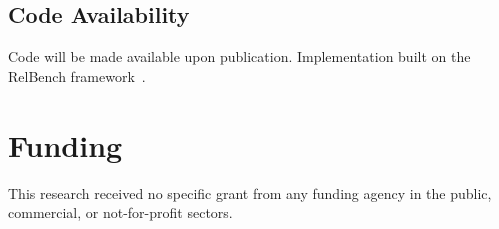 \documentclass[sigconf]{acmart}
\begin{document}
\subsection{Code Availability}

Code will be made available upon publication. Implementation built on the
RelBench framework~\cite{fey2023relbench}.

\section*{Funding}

This research received no specific grant from any funding agency in the public,
commercial, or not-for-profit sectors.


\end{document}
